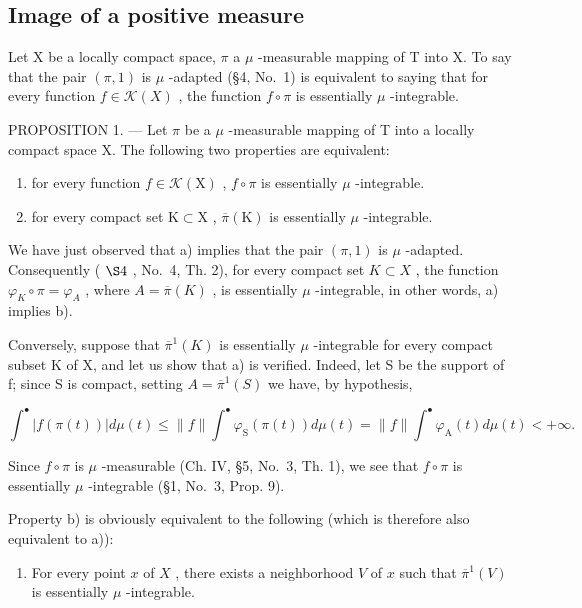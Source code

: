 \subsection{Image of a positive measure}

Let X be a locally compact space, \(\pi\) a \(\mu\) -measurable mapping of T into X. To say that the pair \((\pi,1)\) is \(\mu\) -adapted (§4, No.~1) is equivalent to saying that for every function \(f \in \mathcal{K}(X)\) , the function \(f \circ \pi\) is essentially \(\mu\) -integrable.

PROPOSITION 1. --- Let \(\pi\) be a \(\mu\) -measurable mapping of T into a locally compact space X. The following two properties are equivalent:

\begin{enumerate}
\def\labelenumi{\alph{enumi})}
\item
  for every function \(f \in \mathcal{K}(\mathrm{X})\) , \(f \circ \pi\) is essentially \(\mu\) -integrable.
\item
  for every compact set \(\mathrm{K}\subset \mathrm{X}\) , \(\overline{\pi} (\mathrm{K})\) is essentially \(\mu\) -integrable.
\end{enumerate}

We have just observed that a) implies that the pair \((\pi,1)\) is \(\mu\) -adapted. Consequently ( \(\S4\) , No.~4, Th. 2), for every compact set \(K\subset X\) , the function \(\varphi_{K}\circ\pi=\varphi_{A}\) , where \(A=\overline{\pi}(K)\) , is essentially \(\mu\) -integrable, in other words, a) implies b).

Conversely, suppose that \(\overline{\pi}^{1}(K)\) is essentially \(\mu\) -integrable for every compact subset K of X, and let us show that a) is verified. Indeed, let S be the support of f; since S is compact, setting \(A = \overline{\pi}^{1}(S)\) we have, by hypothesis,

\[
\int^ {\bullet} \left| f (\pi (t)) \right| d \mu (t) \leqslant \| f \| \int^ {\bullet} \varphi_ {\mathrm{S}} (\pi (t)) d \mu (t) = \| f \| \int^ {\bullet} \varphi_ {\mathrm{A}} (t) d \mu (t) <   + \infty .
\]

Since \(f \circ \pi\) is \(\mu\) -measurable (Ch. IV, §5, No.~3, Th. 1), we see that \(f \circ \pi\) is essentially \(\mu\) -integrable (§1, No.~3, Prop. 9).

Property b) is obviously equivalent to the following (which is therefore also equivalent to a)):

\begin{enumerate}
\def\labelenumi{\alph{enumi})}
\setcounter{enumi}{2}
\tightlist
\item
  For every point \(x\) of \(X\) , there exists a neighborhood \(V\) of \(x\) such that \(\overline{\pi}^1(V)\) is essentially \(\mu\) -integrable.
\end{enumerate}

